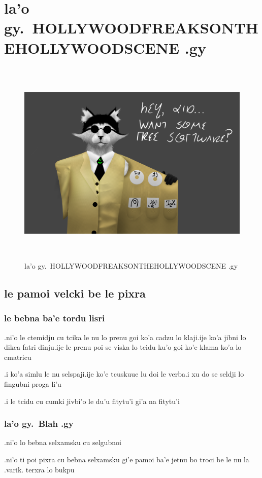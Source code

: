\documentclass{report}
\newcommand\imageheight{10cm}
\begin{document}
\chapter{la'o gy.\ HOLLYWOODFREAKSONTHEHOLLYWOODSCENE .gy}
\begin{figure}[ht]
	\centering
	\includegraphics[height=\imageheight]{hollywoodfreaksonthehollywoodscene/hollywoodfreaksonthehollywoodscene.png}
	\caption[center]{la'o gy.\ HOLLYWOODFREAKSONTHEHOLLYWOODSCENE .gy}
\end{figure}
\section{le pamoi velcki be le pixra}
\subsection{le bebna ba'e tordu lisri}
.ni'o le ctemidju cu tcika le nu lo prenu goi ko'a cadzu lo klaji\@  .ije ko'a jibni lo dikca fatri dinju\@  .ije le prenu poi se viska lo tcidu ku'o goi ko'e klama ko'a lo cmatricu

.i ko'a simlu le nu selspaji\@  .ije ko'e tcuskuue lu doi le verba\@  .i xu do se seldji lo fingubni proga li'u

.i le tcidu cu cumki jivbi'o le du'u fitytu'i gi'a na fitytu'i

\subsection{la'o gy.\ Blah .gy}
.ni'o lo bebna selxamsku cu selgubnoi

.ni'o ti poi pixra cu bebna selxamsku gi'e pamoi ba'e jetnu bo troci be le nu la .varik. terxra lo bukpu
\end{document}
